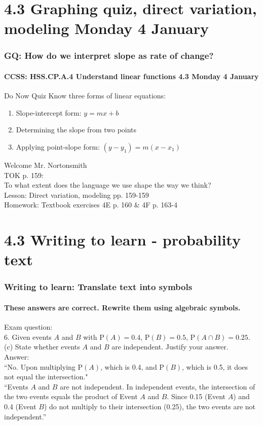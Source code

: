 \documentclass{beamer}
\begin{document}
\section{4.3 Graphing quiz, direct variation, modeling Monday 4 January}
\frame
{
  \frametitle{GQ: How do we interpret slope as rate of change?}
  \framesubtitle{CCSS: HSS.CP.A.4 Understand linear functions \hfill \alert{4.3 Monday 4 January}}

  \begin{block}{Do Now Quiz}
    Know three forms of linear equations:
  \begin{enumerate}
      \item Slope-intercept form: $y=mx+b$
      \item Determining the slope from two points
      \item Applying point-slope form: $(y-y_1)=m(x-x_1)$
  \end{enumerate}
  \end{block}
  Welcome Mr. Nortonsmith\\ \smallskip
  TOK p. 159: \\
  To what extent does the language we use shape the way we think?\\ \bigskip
  Lesson: Direct variation, modeling pp. 159-159 \\ \smallskip
  Homework: Textbook exercises 4E p. 160 \& 4F p. 163-4
}

\section{4.3 Writing to learn - probability text}
\frame
{
  \frametitle{Writing to learn: Translate text into symbols}
  \framesubtitle{These answers are correct. Rewrite them using algebraic symbols.}
  Exam question:\\
  6. Given events $A$ and $B$ with $\mathrm P(A)=0.4$, $\mathrm P(B)=0.5$, $\mathrm P(A \cap B)=0.25$.\\
  (c) State whether events $A$ and $B$ are independent. Justify your answer.\\[0.5cm]
  Answer:\\
  ``No. Upon multiplying $\mathrm P(A)$, which is 0.4, and $\mathrm P(B)$, which is 0.5, it does not equal the intersection."\\[0.5cm]
  ``Events $A$ and $B$ are not independent. In independent events, the intersection of the two events equals the product of Event $A$ and $B$. Since 0.15 (Event $A$) and 0.4 (Event $B$) do not multiply to their intersection (0.25), the two events are not independent.''

}
\end{document}

